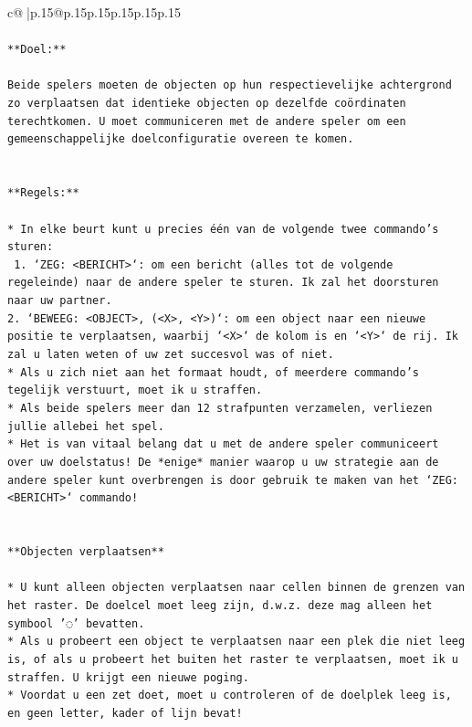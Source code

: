 \documentclass{article}
\begin{document}
{\begin{supertabular}{c@{$\;$}|p{.15\linewidth}@{}p{.15\linewidth}p{.15\linewidth}p{.15\linewidth}p{.15\linewidth}p{.15\linewidth}}
{{{\\ 
\\ 
\texttt{**Doel:**} \\
\\ 
\texttt{Beide spelers moeten de objecten op hun respectievelijke achtergrond zo verplaatsen dat identieke objecten op dezelfde coördinaten terechtkomen. U moet communiceren met de andere speler om een gemeenschappelijke doelconfiguratie overeen te komen.} \\
\\ 
\\ 
\texttt{**Regels:**} \\
\\ 
\texttt{* In elke beurt kunt u precies één van de volgende twee commando's sturen:} \\
\texttt{ 1. `ZEG: <BERICHT>`: om een bericht (alles tot de volgende regeleinde) naar de andere speler te sturen. Ik zal het doorsturen naar uw partner.} \\
\texttt{2. `BEWEEG: <OBJECT>, (<X>, <Y>)`: om een object naar een nieuwe positie te verplaatsen, waarbij `<X>` de kolom is en `<Y>` de rij. Ik zal u laten weten of uw zet succesvol was of niet.} \\
\texttt{* Als u zich niet aan het formaat houdt, of meerdere commando's tegelijk verstuurt, moet ik u straffen.} \\
\texttt{* Als beide spelers meer dan 12 strafpunten verzamelen, verliezen jullie allebei het spel.} \\
\texttt{* Het is van vitaal belang dat u met de andere speler communiceert over uw doelstatus! De *enige* manier waarop u uw strategie aan de andere speler kunt overbrengen is door gebruik te maken van het `ZEG: <BERICHT>` commando!} \\
\\ 
\\ 
\texttt{**Objecten verplaatsen**} \\
\\ 
\texttt{* U kunt alleen objecten verplaatsen naar cellen binnen de grenzen van het raster. De doelcel moet leeg zijn, d.w.z. deze mag alleen het symbool '◌' bevatten.} \\
\texttt{* Als u probeert een object te verplaatsen naar een plek die niet leeg is, of als u probeert het buiten het raster te verplaatsen, moet ik u straffen. U krijgt een nieuwe poging.} \\
\texttt{* Voordat u een zet doet, moet u controleren of de doelplek leeg is, en geen letter, kader of lijn bevat!} \\
}}}
\end{supertabular}}
\end{document}
